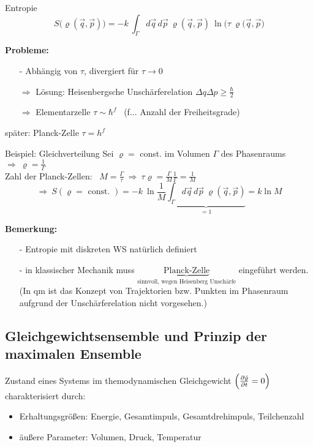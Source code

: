 \begin{definition}{Entropie}
    \begin{equation}
        S \bigl(\varrho ( \Vec{q},\Vec{p}) \bigr) = - k \ \int_\Gamma d\Vec{q} \, d\Vec{p} \ \varrho(\Vec{q},\Vec{p}) \ \ln{\bigl(\tau \ \varrho(\Vec{q},\Vec{p}\bigr)}
    \end{equation}
    
\end{definition}

\textbf{Probleme:}
\begin{itemize}
    \item[-] Abhängig von $ \tau$, divergiert für $\tau \rightarrow 0$
    \item[$\Rightarrow$] Lösung: Heisenbergsche Unschärferelation $\Delta q \Delta p \geq \frac{\hbar}{2}$
    \item[$\Rightarrow$] Elementarzelle $\tau \sim \hbar^f$ \ (f... Anzahl der Freiheitsgrade)
\end{itemize}

später: Planck-Zelle $\tau = h^f$

\begin{beispiel}{Beispiel: Gleichverteilung}
    Sei $\varrho=$ const. im Volumen $\Gamma$ des Phasenraums $\Rightarrow \ \varrho = \frac{1}{\Gamma}$ \\
    Zahl der Planck-Zellen: \ $M = \frac{\Gamma}{\tau} \ \Rightarrow \ \tau \varrho = \frac{\Gamma}{M} \frac{1}{\Gamma} = \frac{1}{M}$
    \begin{equation*}
        \Rightarrow \ S(\varrho = \text{ const. }) = -k \ \ln{\frac{1}{M}} \underbrace{\int_\Gamma d\Vec{q} \, d\Vec{p} \ \varrho(\Vec{q},\Vec{p})}_{=1} = k \ln M
    \end{equation*}

    \textbf{Bemerkung:} 
    \begin{itemize}
        \item[-] Entropie mit diskreten WS natürlich definiert
        \item[-] in klassischer Mechanik muss $\underbrace{\text{Planck-Zelle}}_{\text{sinnvoll, wegen Heisenberg Unschärfe}}$ eingeführt werden. (In qm ist das Konzept von Trajektorien bzw. Punkten im Phasenraum aufgrund der Unschärferelation nicht vorgesehen.)
    \end{itemize}
\end{beispiel}

\subsection{Gleichgewichtsensemble und Prinzip der maximalen Ensemble} 
Zustand eines Systems im themodynamischen Gleichgewicht $\Bigl( \frac{\partial \hat{\varrho}}{\partial t} = 0 \Bigr)$ charakterisiert durch:
\begin{itemize}
    \item Erhaltungsgrößen: Energie, Gesamtimpuls, Gesamtdrehimpuls, Teilchenzahl
    \item äußere Parameter: Volumen, Druck, Temperatur
\end{itemize}


